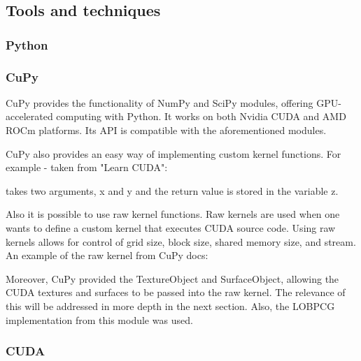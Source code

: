 \subsection{Tools and techniques}

\subsubsection{Python}

\cite{mayavi}


\subsubsection{CuPy}

CuPy provides the functionality of NumPy and SciPy modules, offering GPU-accelerated computing with Python. It works on both Nvidia CUDA and AMD ROCm platforms. Its API is compatible with the aforementioned modules.\cite{cupy_overview}

CuPy also provides an easy way of implementing custom kernel functions. For example - taken from "Learn CUDA":\cite{learn_cuda}

\vspace{0.2cm}

takes two arguments, x and y and the return value is stored in the variable z.

Also it is possible to use raw kernel functions. Raw kernels are used when one wants to define a custom kernel that executes CUDA source code. Using raw kernels allows for control of grid size, block size, shared memory size, and stream. An example of the raw kernel from CuPy docs\cite{cupy_raw_kernel}:

\vspace{0.2cm}


Moreover, CuPy provided the TextureObject\cite{cupy_texture} and SurfaceObject\cite{cupy_surface}, allowing the CUDA textures and surfaces to be passed into the raw kernel. The relevance of this will be addressed in more depth in the next section. Also, the LOBPCG implementation from this module was used.\cite{cupy_lobpcg}


\subsubsection{CUDA}

